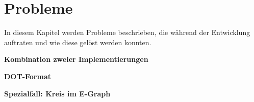 \section{Probleme}\label{sec:probleme}

In diesem Kapitel werden Probleme beschrieben, die während der Entwicklung auftraten und wie diese gelöst werden konnten.

\noindent\textbf{Kombination zweier Implementierungen}




\noindent\textbf{DOT-Format} 




\noindent\textbf{Spezialfall: Kreis im E-Graph}



